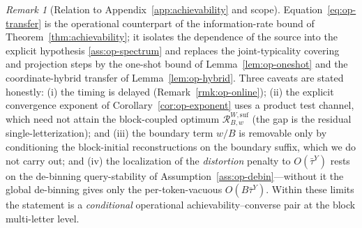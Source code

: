 \documentclass[11pt]{article}
\theoremstyle{plain}
\theoremstyle{definition}
\theoremstyle{remark}
\newtheorem{remark}[theorem]{Remark}
\begin{document}
\begin{remark}[Relation to Appendix~\ref{app:achievability} and scope]
\label{rmk:op-scope}
Equation~\eqref{eq:op-transfer} is the operational counterpart of the
information-rate bound of Theorem~\ref{thm:achievability}; it isolates
the dependence of the source into the explicit hypothesis
\ref{ass:op-spectrum} and replaces the joint-typicality covering and
projection steps by the one-shot bound of Lemma~\ref{lem:op-oneshot}
and the coordinate-hybrid transfer of Lemma~\ref{lem:op-hybrid}. Three
caveats are stated honestly: (i) the timing is delayed
(Remark~\ref{rmk:op-online}); (ii) the explicit convergence exponent
of Corollary~\ref{cor:op-exponent} uses a product test channel, which
need not attain the block-coupled optimum
$\mathcal R^{W,\mathrm{suf}}_{B,w}$ (the gap is the residual
single-letterization); and (iii) the boundary term $w/B$ is removable
only by conditioning the block-initial reconstructions on the
boundary suffix, which we do not carry out; and (iv) the localization
of the \emph{distortion} penalty to $O(\bar\tau^Y)$ rests on the
de-binning query-stability of Assumption~\ref{ass:op-debin}---without
it the global de-binning gives only the per-token-vacuous
$O(B\bar\tau^Y)$. Within these limits the statement is a
\emph{conditional} operational achievability--converse pair at the
block multi-letter level.
\end{remark}
\end{document}
